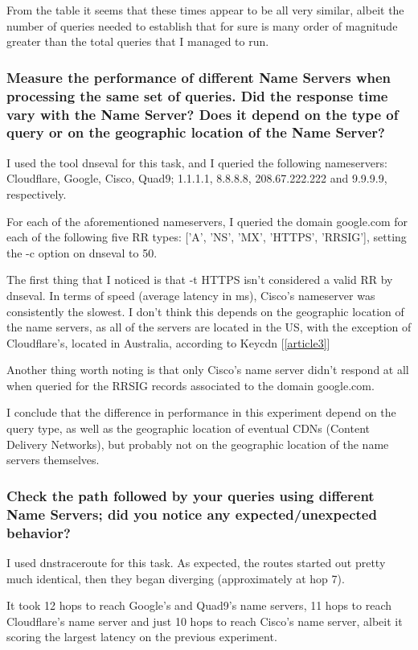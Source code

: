 \documentclass[a4paper,10pt]{article}
\begin{document}
From the table it seems that these times appear to be all very similar, albeit the number of queries needed to establish that for sure is many order of magnitude greater than the total queries that I managed to run.


\subsubsection{Measure the performance of different Name Servers when processing the same
set of queries. Did the response time vary with the Name Server? Does it depend
on the type of query or on the geographic location of the Name Server?}

I used the tool dnseval for this task, and I queried the following nameservers: Cloudflare, Google, Cisco, Quad9; 1.1.1.1, 8.8.8.8, 208.67.222.222 and 9.9.9.9, respectively.

For each of the aforementioned nameservers, I queried the domain google.com for each of the following five RR types: ['A', 'NS', 'MX', 'HTTPS', 'RRSIG'], setting the -c option on dnseval to 50.

The first thing that I noticed is that -t HTTPS isn't considered a valid RR by dnseval. In terms of speed (average latency in ms), Cisco's nameserver was consistently the slowest. I don't think this depends on the geographic location of the name servers, as all of the servers are located in the US, with the exception of Cloudflare's, located in Australia, according to Keycdn [\ref{article3}] 

Another thing worth noting is that only Cisco's name server didn't respond at all when queried for the RRSIG records associated to the domain google.com.

I conclude that the difference in performance in this experiment depend on the query type, as well as the geographic location of eventual CDNs (Content Delivery Networks), but probably not on the geographic location of the name servers themselves.


\subsubsection{Check the path followed by your queries using different Name Servers; did you
notice any expected/unexpected behavior?}

I used dnstraceroute for this task. As expected, the routes started out pretty much identical, then they began diverging (approximately at hop 7). 

It took 12 hops to reach Google's and Quad9's name servers, 11 hops to reach Cloudflare's name server and just 10 hops to reach Cisco's name server, albeit it scoring the largest latency on the previous experiment.
\end{document}
